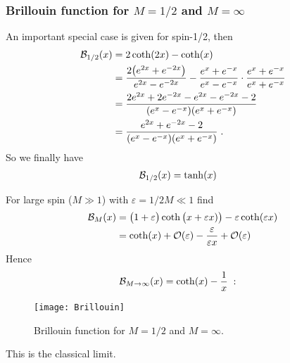 \subsubsection{Brillouin function for $M=1/2$ and $M=\infty$}
An important special case is given for spin-1/2, then
%
\begin{align*}
{\cal B}_{1/2}(x) &= 2 \coth(2 x) - \coth(x)\\
&=\frac{2\big( e^{2x}+e^{-2x} \big)}{e^{2x}-e^{-2x}}
-\frac{ e^{x}+e^{-x} }{e^{x}-e^{-x}}\cdot
\frac{ e^{x}+e^{-x} }{e^{x}+e^{-x}}\\
&=\frac{2 e^{2x}+2e^{-2x} -e^{2x}-e^{-2x}-2}{(e^{x}-e^{-x})(e^{x}+e^{-x})}\\
&=\frac{e^{2x}+e^{-2x} -2}{(e^{x}-e^{-x})(e^{x}+e^{-x})}\;.
\end{align*}
%
So we finally have
%
\begin{align}\label{eq:brillouin:spin:12}
{\cal B}_{1/2}(x) &= \tanh(x)
\end{align}


For large  spin ($M\gg 1$) with $\varepsilon=1/2M\ll 1$ find 
%
\begin{align*}
{\cal B}_{M}(x) &= \big( 1+\varepsilon \big)\coth\big( x+\varepsilon x)\big) - \varepsilon \coth(\varepsilon x)\\
&= \coth(x) +{\cal O}(\varepsilon) -\frac{\varepsilon}{\varepsilon x} +{\cal O}(\varepsilon)
\end{align*}
%
Hence 
%
\begin{subequations}\label{eq:}
\begin{align}
{\cal B}_{M\to \infty}(x) &= \coth(x) -\frac{1}{x}\;:
\end{align}
\end{subequations}

\begin{figure}[ht]
\begin{center}
\texttt{[image: Brillouin]}
\caption{Brillouin function for $M = 1/2$ and $M = \infty$.}
\end{center}
\end{figure}

%
This is the classical limit. 
%
